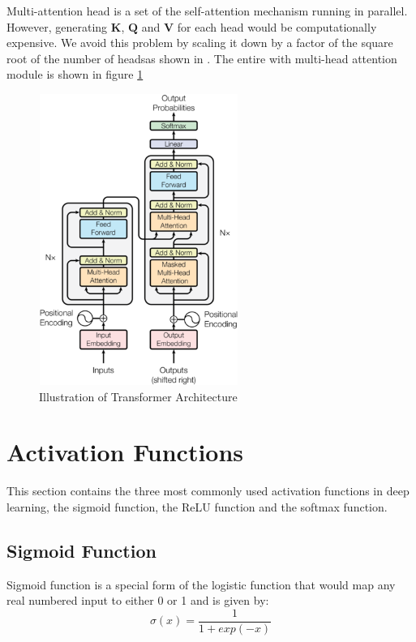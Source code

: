 Multi-attention head is a set of the self-attention mechanism running in parallel. However, generating $\mathbf{K}$, $\mathbf{Q}$ and $\mathbf{V}$ for each head would be computationally expensive. We avoid this problem by scaling it down by a factor of the square root of the number of headsas shown in . The entire with multi-head attention module is shown in figure \ref{fig:transformer-architecture}

\FloatBarrier
\begin{figure}[ht]
\includegraphics[width=6.5cm, height=9.5cm]{images/transformer_architecture.png}
\centering
\caption{Illustration of Transformer Architecture \protect\cite{attention-is-all-you-need}}
\label{fig:transformer-architecture}
\end{figure}
\FloatBarrier

\section{Activation Functions}
This section contains the three most commonly used activation functions in deep learning, the sigmoid function, the ReLU function and the softmax function.
\subsection{Sigmoid Function}
Sigmoid function is a special form of the logistic function that would map any real numbered input to either 0 or 1 and is given by:
\begin{equation}
    \sigma (x) = \frac{1}{1+exp(-x)}
\end{equation}

